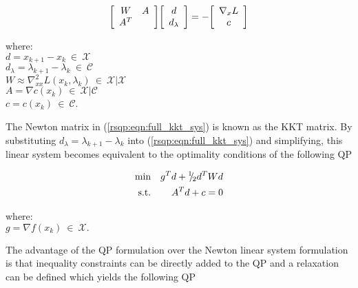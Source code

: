 \documentclass[pdf,ps2pdf,11pt]{SANDreport}
\begin{document}
{{\bsinglespace
\begin{equation}
{\bmat{cc}
	W    & A \\
	A^T  &
\emat}
{\bmat{c}
	d \\
	d_{\lambda}
\emat}
=
-
{\bmat{c}
	\nabla_x L \\
	c
\emat}
\label{rsqp:eqn:full_kkt_sys}
\end{equation}
\begin{tabbing}
\hspace{4ex}where:\hspace{5ex}\= \\
\>	$d = x_{k+1} - x_k \:\in\:\mathcal{X}$ \\
\>	$d_{\lambda} = \lambda_{k+1} - \lambda_k \:\in\:\mathcal{C}$ \\
\>	$W \approx \nabla_{xx}^2 L(x_k,\lambda_k) \:\in\:\mathcal{X}|\mathcal{X}$ \\
\>	$A = \nabla c(x_k) \:\in\:\mathcal{X}|\mathcal{C}$ \\
\>	$c = c(x_k) \:\in\:\mathcal{C}$.
\end{tabbing}
\esinglespace}

The Newton matrix in (\ref{rsqp:eqn:full_kkt_sys}) is known as the KKT matrix.
By substituting $d_{\lambda} = \lambda_{k+1} - \lambda_k$ into (\ref{rsqp:eqn:full_kkt_sys})
and simplifying, this linear system becomes equivalent to the optimality conditions of
the following QP

{\bsinglespace
\begin{eqnarray}
\mbox{min}  &  & g^T d + {}^1 \!\! / \! {}_2 d^T W d                   \label{moocho:eqn:qp_newton:obj} \\
\mbox{s.t.} &  & A^T d + c = 0                                \label{moocho:eqn:qp_newton:equ}
\end{eqnarray}
\begin{tabbing}
\hspace{4ex}where:\hspace{5ex}\= \\
\>	$g = \nabla f(x_k) \:\in\:\mathcal{X}.$
\end{tabbing}
\esinglespace}

The advantage of the QP formulation over the Newton linear system formulation is that
inequality constraints can be directly added to the QP and a relaxation can be defined
which yields the following QP

}
\end{document}
